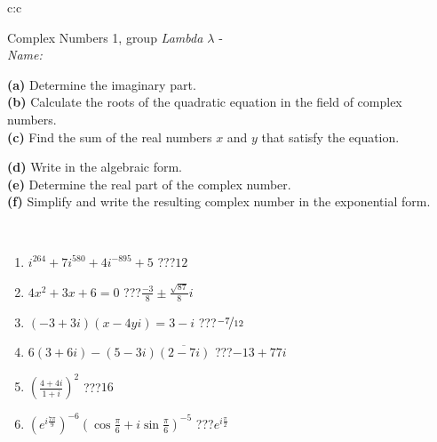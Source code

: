 \documentclass[10pt]{report}
\begin{document}
\begin{tabular}{c:c}
\begin{minipage}[c][104.5mm][t]{0.5\linewidth}
\begin{center}
\vspace{5mm}
{\huge Complex Numbers 1, group \textit{Lambda $\lambda$} -}\\[5mm]
\textit{Name:}\phantom{xxxxxxxxxxxxxxxxxxxxxxxxxxxxxxxxxxxxxxxxxxxxxxxxxxxxxxxxxxxxxxxxx}\\[5mm]
\begin{minipage}{0.95\linewidth}
\begin{center}
{\small \begin{minipage}{0.44\textwidth} \raggedright
\textbf{(a)} Determine the imaginary part. \\[1mm]
\textbf{(b)} Calculate the roots of the quadratic equation in the field of complex numbers. \\[1mm]
\textbf{(c)} Find the sum of the real numbers \(x\) and \(y\) that satisfy the equation. \end{minipage} \begin{minipage}{0.54\textwidth}
\textbf{(d)} Write in the algebraic form. \\[1mm]
\textbf{(e)} Determine the real part of the complex number. \\[1mm]
\textbf{(f)} Simplify and write the resulting complex number in the exponential form.
\end{minipage}
} \vspace{3mm}
\end{center}
\end{minipage}
\\[1mm]
\begin{minipage}{0.79\linewidth}
\begin{center}
\begin{varwidth}{\linewidth}
\setlength{\itemsep}{0pt}
\begin{enumerate}
\large
\item $i^{264}+7i^{580}+4i^{-895}+5$\quad \dotfill\; ???\;\dotfill \quad $12$
\item $4x^2+3x+6=0$\quad \dotfill\; ???\;\dotfill \quad $\frac{-3}{8} \pm{}\frac{ \sqrt{87}}{8}i$
\item $(-3+3i)(x-4yi)=3-i$\quad \dotfill\; ???\;\dotfill \quad $\nicefrac{-7}{12}$
\item $6(3+6i)-(5-3i)\overline{(2-7i)}$\quad \dotfill\; ???\;\dotfill \quad $-13+77i$
\item $\left(\frac{4+4i}{1+i}\right)^2$\quad \dotfill\; ???\;\dotfill \quad $16$
\item $\left(e^{i\frac{7\pi}{9}}\right)^{-6}\left(\cos{\frac{\pi}{6}}+i\sin{\frac{\pi}{6}}\right)^{-5}$\quad \dotfill\; ???\;\dotfill \quad $e^{i\frac{\pi}{2}}$

\end{enumerate}
\end{varwidth}
\end{center}
\end{minipage}
\end{center}
\end{minipage}
\end{tabular}
\end{document}
